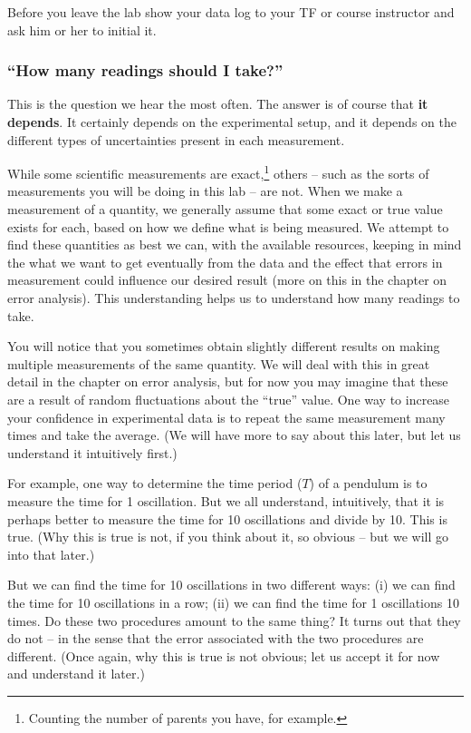 Before you leave the lab show your data log to your TF or course instructor and ask him or her to initial it. 

\subsubsection{``How many readings should I take?''}

This is the question we hear the most often. The answer is of course that \textbf{it depends}. It certainly depends on the experimental setup, and it depends on the different types of uncertainties present in each measurement.

While some scientific measurements are exact,\footnote{Counting the number of parents you have, for example.} others -- such as the sorts of measurements you will be doing in this lab -- are not. When we make a measurement of a quantity, we generally assume that some exact or true value exists for each, based on how we define what is being measured. We attempt to find these quantities as best we can, with the available resources, keeping in mind the what we want to get eventually from the data and the effect that errors in measurement could influence our desired result (more on this in the chapter on error analysis). This understanding helps us to understand how many readings to take. 

You will notice that you sometimes obtain slightly different results on making multiple measurements of the same quantity. We will deal with this in great detail in the chapter on error analysis, but for now you may imagine that these are a result of random fluctuations about the ``true'' value. One way to increase your confidence in experimental data is to repeat the same measurement many times and take the average. (We will have more to say about this later, but let us understand it intuitively first.)

For example, one way to determine the time period ($T$) of a pendulum is to measure the time for 1 oscillation. But we all understand, intuitively, that it is perhaps better to measure the time for 10 oscillations and divide by 10.  This is true. (Why this is true is not, if you think about it, so obvious -- but we will go into that later.)

But we can find the time for 10 oscillations in two different ways: (i) we can find the time for 10 oscillations in a row; (ii) we can find the time for 1 oscillations 10 times. Do these two procedures amount to the same thing? It turns out that they do not -- in the sense that the error associated with the two procedures are different. (Once again, why this is true is not obvious; let us accept it for now and understand it later.) 

